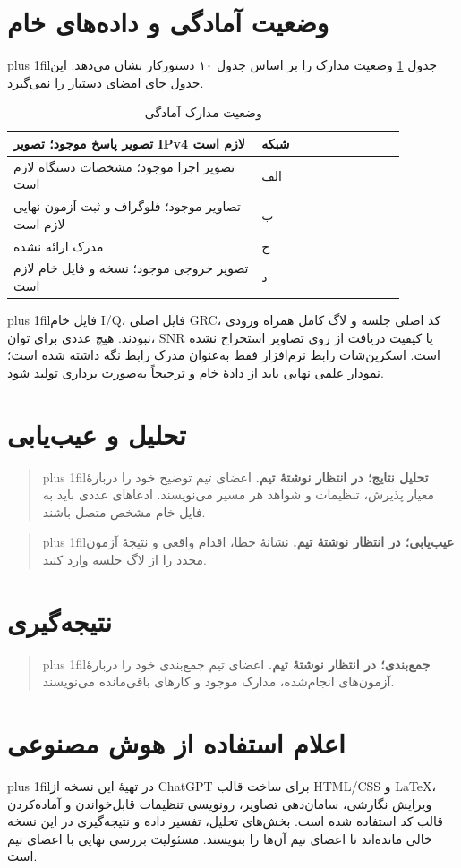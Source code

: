 \documentclass[10pt,a4paper]{article}
\newcommand{\rtl}[1]{\beginR #1\endR}
\newcommand{\rp}[1]{\par\begingroup\rightskip=0pt\leftskip=0pt plus 1fil\parfillskip=0pt\noindent\beginR #1\endR\par\endgroup}
\begin{document}
\section{\rtl{وضعیت آمادگی و داده‌های خام}}
\rp{جدول \ref{tab:ready} وضعیت مدارک را بر اساس جدول ۱۰ دستورکار نشان می‌دهد. این جدول جای امضای دستیار را نمی‌گیرد.}
\begin{table}[H]\centering
\renewcommand{\arraystretch}{1.2}
\begin{tabular}{|p{0.55\linewidth}|p{0.32\linewidth}|}\hline
\rtl{تصویر پاسخ موجود؛ تصویر IPv4 لازم است} & \rtl{شبکه} \\ \hline
\rtl{تصویر اجرا موجود؛ مشخصات دستگاه لازم است} & \rtl{الف} \\ \hline
\rtl{تصاویر موجود؛ فلوگراف و ثبت آزمون نهایی لازم است} & \rtl{ب} \\ \hline
\rtl{مدرک ارائه نشده} & \rtl{ج} \\ \hline
\rtl{تصویر خروجی موجود؛ نسخه و فایل خام لازم است} & \rtl{د} \\ \hline
\end{tabular}
\caption{\rtl{وضعیت مدارک آمادگی}}\label{tab:ready}\end{table}
\rp{فایل خام I/Q، فایل اصلی GRC، کد اصلی جلسه و لاگ کامل همراه ورودی نبودند. هیچ عددی برای توان، SNR یا کیفیت دریافت از روی تصاویر استخراج نشده است. اسکرین‌شات رابط نرم‌افزار فقط به‌عنوان مدرک رابط نگه داشته شده است؛ نمودار علمی نهایی باید از دادهٔ خام و ترجیحاً به‌صورت برداری تولید شود.}

\section{\rtl{تحلیل و عیب‌یابی}}
\begin{quote}\rp{\textbf{تحلیل نتایج؛ در انتظار نوشتهٔ تیم.} اعضای تیم توضیح خود را دربارهٔ معیار پذیرش، تنظیمات و شواهد هر مسیر می‌نویسند. ادعاهای عددی باید به فایل خام مشخص متصل باشند.}\end{quote}
\begin{quote}\rp{\textbf{عیب‌یابی؛ در انتظار نوشتهٔ تیم.} نشانهٔ خطا، اقدام واقعی و نتیجهٔ آزمون مجدد را از لاگ جلسه وارد کنید.}\end{quote}
\section{\rtl{نتیجه‌گیری}}
\begin{quote}\rp{\textbf{جمع‌بندی؛ در انتظار نوشتهٔ تیم.} اعضای تیم جمع‌بندی خود را دربارهٔ آزمون‌های انجام‌شده، مدارک موجود و کارهای باقی‌مانده می‌نویسند.}\end{quote}
\section{\rtl{اعلام استفاده از هوش مصنوعی}}
\rp{در تهیهٔ این نسخه از ChatGPT برای ساخت قالب HTML/CSS و LaTeX، ویرایش نگارشی، سامان‌دهی تصاویر، رونویسی تنظیمات قابل‌خواندن و آماده‌کردن قالب کد استفاده شده است. بخش‌های تحلیل، تفسیر داده و نتیجه‌گیری در این نسخه خالی مانده‌اند تا اعضای تیم آن‌ها را بنویسند. مسئولیت بررسی نهایی با اعضای تیم است.}

\begin{minipage}{\linewidth}
\small


\end{minipage}
\end{document}
